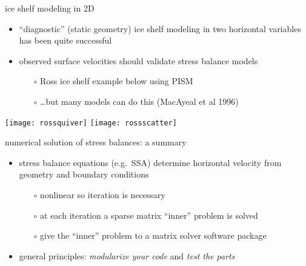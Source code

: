\begin{frame}{ice shelf modeling in 2D}

\begin{itemize}
\item ``diagnostic'' (static geometry) ice shelf modeling in two horizontal variables has been quite successful
\item observed surface velocities should validate stress balance models
  \begin{itemize}
  \item[$\circ$] Ross ice shelf example below using PISM
  \item[$\circ$] \dots but many models can do this (MacAyeal et al 1996\nocite{MacAyealetal})
  \end{itemize}
\end{itemize}

\begin{center}
  \texttt{[image: rossquiver]} \quad  \texttt{[image: rossscatter]}
\end{center}
\end{frame}


\begin{frame}{numerical solution of stress balances: a summary}

\begin{itemize}
\item stress balance equations (e.g.~SSA) determine horizontal velocity from geometry and boundary conditions
  \begin{itemize}
  \item[$\circ$] nonlinear so iteration is necessary
  \item[$\circ$] at each iteration a sparse matrix ``inner'' problem is solved
  \item[$\circ$] give the ``inner'' problem to a matrix solver software package
  \end{itemize}

\bigskip
\item general principles: \emph{modularize your code} and \emph{test the parts}
\end{itemize}
\end{frame}


